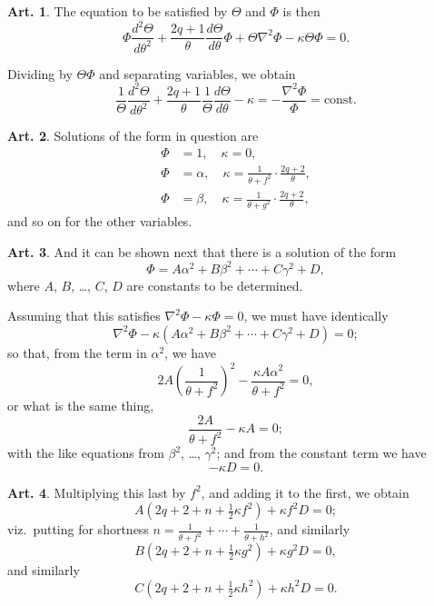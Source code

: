 \documentclass[12pt,a4paper]{article}
\theoremstyle{definition}
\newtheorem{art}{Art.}[section]
\begin{document}
\begin{art}\label{art:115}
The equation to be satisfied by $\Theta$ and $\Phi$ is then
\[
\Phi \frac{d^2\Theta}{d\theta^2} + \frac{2q+1}{\theta}\frac{d\Theta}{d\theta} \Phi + \Theta \nabla^2\Phi - \kappa\Theta\Phi = 0.
\]

Dividing by $\Theta\Phi$ and separating variables, we obtain
\[
\frac{1}{\Theta}\frac{d^2\Theta}{d\theta^2} + \frac{2q+1}{\theta}\frac{1}{\Theta}\frac{d\Theta}{d\theta} - \kappa = -\frac{\nabla^2\Phi}{\Phi} = \text{const.}
\]
\end{art}

\begin{art}\label{art:116}
Solutions of the form in question are
\begin{align*}
\Phi &= 1, \quad \kappa = 0, \\
\Phi &= \alpha, \quad \kappa = \frac{1}{\theta+f^2} \cdot \frac{2q+2}{\theta}, \\
\Phi &= \beta, \quad \kappa = \frac{1}{\theta+g^2} \cdot \frac{2q+2}{\theta},
\end{align*}
and so on for the other variables.
\end{art}

\begin{art}\label{art:117}
And it can be shown next that there is a solution of the form
\[
\Phi = A\alpha^2 + B\beta^2 + \cdots + C\gamma^2 + D,
\]
where $A$, $B$, \ldots, $C$, $D$ are constants to be determined.

Assuming that this satisfies $\nabla^2\Phi - \kappa\Phi = 0$, we must have identically
\[
\nabla^2\Phi - \kappa(A\alpha^2 + B\beta^2 + \cdots + C\gamma^2 + D) = 0;
\]
so that, from the term in $\alpha^2$, we have
\[
2A\left(\frac{1}{\theta+f^2}\right)^2 - \frac{\kappa A \alpha^2}{\theta+f^2} = 0,
\]
or what is the same thing,
\[
\frac{2A}{\theta+f^2} - \kappa A = 0;
\]
with the like equations from $\beta^2$, \ldots, $\gamma^2$; and from the constant term we have
\[
-\kappa D = 0.
\]
\end{art}

\begin{art}\label{art:118}
Multiplying this last by $f^2$, and adding it to the first, we obtain
\[
A(2q+2+n+\tfrac{1}{2}\kappa f^2) + \kappa f^2 D = 0;
\]
viz.\ putting for shortness $n = \frac{1}{\theta+f^2} + \cdots + \frac{1}{\theta+h^2}$, and similarly
\[
B(2q+2+n+\tfrac{1}{2}\kappa g^2) + \kappa g^2 D = 0,
\]
and similarly
\[
C(2q+2+n+\tfrac{1}{2}\kappa h^2) + \kappa h^2 D = 0.
\]
\end{art}
\end{document}
